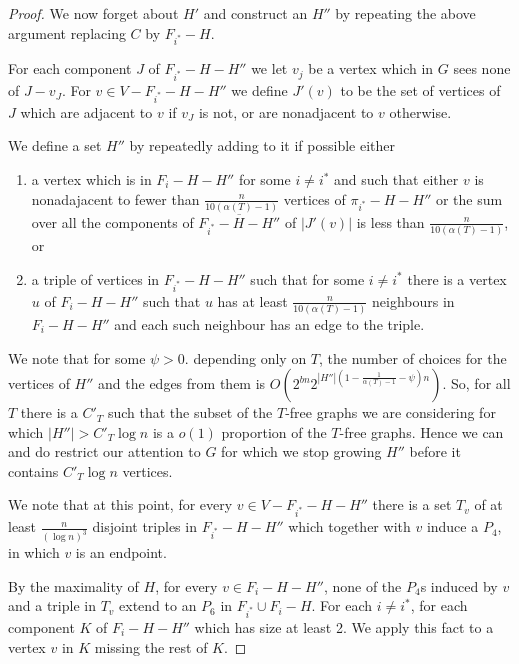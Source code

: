 \documentclass[12pt]{article}
\theoremstyle{definition}
\begin{document}
\begin{proof}
We now forget about $H'$ and construct an $H''$ by  repeating the above argument replacing $C$ by $F_{i^*}-H$. 


For each component $J$ of $F_{i^*}-H-H''$ we let $v_j$ be a vertex which in $G$ sees none of $J-v_J$. 
For $v\in V-F_{i^*}-H-H''$ we define $J'(v)$ to be the set of vertices of $J$ which are adjacent to $v$ if $v_J$ is not, or are nonadjacent to $v$ otherwise. 

We define a set $H''$ by repeatedly adding to it  if possible either 
\begin{enumerate}
\item[(a)]  a vertex which  is  in $F_i-H-H''$ for some $i \neq {i^*}$  and such that either $v$ is nonadajacent to fewer than $\frac{n}{10(\alpha(T)-1)}$
vertices of $\pi_{i^*}-H-H''$ or the sum over all the components  of  $\overline{F_{i^*}-H-H''} $ of  $|J'(v)|$
is less than $\frac{n}{10(\alpha(T)-1)}$, or 
\item[(b)] a triple of vertices   in $F_{i^*}-H-H''$  such that  for some $i \neq {i^*}$  there is a vertex $u$ of $F_i-H-H''$ such that $u$  has at least
$\frac{n}{10(\alpha(T)-1)}$ neighbours in $F_i-H-H''$ and each such neighbour has an edge to the triple.  
\end{enumerate}

We note that for some $\psi>0$. depending only on $T$, the number of choices for the vertices of $H''$ and the edges from them is $O(2^{bn}2^{|H''|(1-\frac{1}{\alpha(T)-1}-\psi)n})$.
So, for all $T$ there is a $C'_T$ such that  the subset of the   $T$-free graphs  we are considering for which $|H''|>C'_T \log n$ is a $o(1)$ proportion of the $T$-free graphs. 
Hence we can  and do restrict our attention to $G$ for which we stop growing $H''$ before it contains $C'_T \log n$ vertices. 


We note that at this point, for every $v \in V-F_{i^*}-H-H''$  there  is a set $T_v$ of at least $\frac{n}{(\log n)^3}$ disjoint triples  in $F_{i^*}-H-H''$ which together with $v$ induce a $P_4$, in which $v$ is an endpoint. 

By the maximality of $H$,  for every $v \in F_i-H-H''$, none of the $P_4$s  induced by $v$ and a triple in $T_v$ extend to an  $P_6$ in $F_{i^*} \cup F_i-H$.
For each $i \neq i^*$,  for each component $K$ of $F_i-H-H''$ which has size at least 2. 
We apply  this fact to a vertex  $v$ in $K$ missing the rest of $K$. 



\end{proof}
\end{document}
